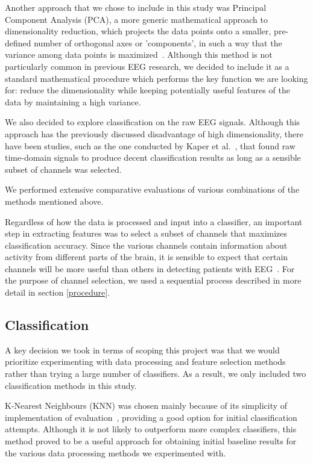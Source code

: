 \documentclass{mpaper}
\begin{document}
Another approach that we chose to include in this study was Principal Component Analysis (PCA), a more generic mathematical approach to dimensionality reduction, which projects the data points onto a smaller, pre-defined number of orthogonal axes or 'components', in such a way that the variance among data points is maximized~\cite{kumar_understanding_2018,wold_principal_1987}. Although this method is not particularly common in previous EEG research, we decided to include it as a standard mathematical procedure which performs the key function we are looking for: reduce the dimensionality while keeping potentially useful features of the data by maintaining a high variance. 

We also decided to explore classification on the raw EEG signals. Although this approach has the previously discussed disadvantage of high dimensionality, there have been studies, such as the one conducted by Kaper et al.~\cite{kaper_bci_2004}, that found raw time-domain signals to produce decent classification results as long as a sensible subset of channels was selected.

We performed extensive comparative evaluations of various combinations of the methods mentioned above.

Regardless of how the data is processed and input into a classifier, an important step in extracting features was to select a subset of channels that maximizes classification accuracy. Since the various channels contain information about activity from different parts of the brain, it is sensible to expect that certain channels will be more useful than others in detecting patients with EEG~\cite{vuckovic_dynamic_2014}. For the purpose of channel selection, we used a sequential process described in more detail in section \ref{procedure}.

\subsection{Classification}

A key decision we took in terms of scoping this project was that we would prioritize experimenting with data processing and feature selection methods rather than trying a large number of classifiers. As a result, we only included two classification methods in this study.

K-Nearest Neighbours (KNN) was chosen mainly because of its simplicity of implementation of evaluation~\cite{harrison_machine_2019}, providing a good option for initial classification attempts. Although it is not likely to outperform more complex classifiers, this method proved to be a useful approach for obtaining initial baseline results for the various data processing methods we experimented with.
\end{document}
